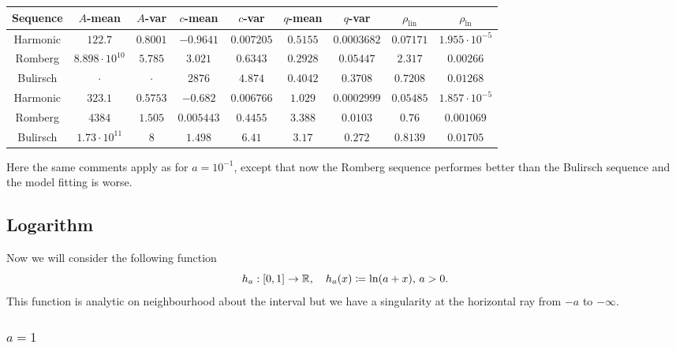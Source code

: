 \begin{table}[H]
    \centering
    \small
    \begin{tabular}{c||c|c|c|c|c|c|c|c}
Sequence & \(A\)-mean & \(A\)-var & \(c\)-mean & \(c\)-var & \(q\)-mean & \(q\)-var & \(\rho_{\operatorname{lin}}\) & \(\rho_{\ln}\)\\\hline
\rowcolor{red}
Harmonic & \(122.7\) & \(0.8001\) & \(-0.9641\) & \(0.007205\) & \(0.5155\) & \(0.0003682\) & \(0.07171\) & \(1.955\cdot 10^{-5}\) \\
\rowcolor{red}
Romberg & \(8.898\cdot 10^{10}\) & \(5.785\) & \(3.021\) & \(0.6343\) & \(0.2928\) & \(0.05447\) & \(2.317\) & \(0.00266\) \\
\rowcolor{red}
Bulirsch & \(\cdot\) & \(\cdot\) & \(2876\) & \(4.874\) & \(0.4042\) & \(0.3708\) & \(0.7208\) & \(0.01268\) \\
\rowcolor{red}
Harmonic & \(323.1\) & \(0.5753\) & \(-0.682\) & \(0.006766\) & \(1.029\) & \(0.0002999\) & \(0.05485\) & \(1.857\cdot 10^{-5}\) \\
\rowcolor{yellow}
Romberg & \(4384\) & \(1.505\) & \(0.005443\) & \(0.4455\) & \(3.388\) & \(0.0103\) & \(0.76\) & \(0.001069\) \\
\rowcolor{red}
Bulirsch & \(1.73\cdot 10^{11}\) & \(8\) & \(1.498\) & \(6.41\) & \(3.17\) & \(0.272\) & \(0.8139\) & \(0.01705\) \\
    \end{tabular}
    \label{tab:my_label}
\end{table}

Here the same comments apply as for \(a = 10^{-1}\), except that now the Romberg sequence performes better than the Bulirsch sequence and the model fitting is worse. 

\subsection{Logarithm}

Now we will consider the following function 
\[
h_a: [0, 1] \rightarrow \mathbb{R}, \quad h_a(x) \coloneqq \ln(a + x),\, a > 0.
\]
This function is analytic on neighbourhood about the interval but we have a singularity at the horizontal ray from \(-a\) to \(-\infty\).

\subsubsection{\(a = 1\)}

